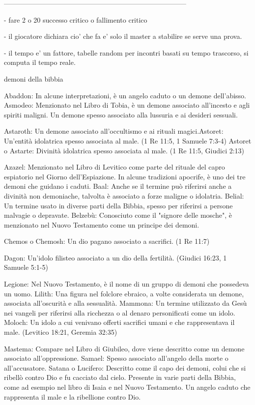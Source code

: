 \documentclass[12pt,a4paper,twoside,openany]{book}
\begin{document}
--------------------------------------------------------------------------------



- fare 2 o 20  successo critico o fallimento  critico

- il giocatore dichiara cio' che fa e' solo il master a stabilire se serve una prova. 

- il tempo e' un fattore, tabelle random per incontri basati su tempo trascorso, si computa il tempo reale.



demoni della bibbia

Abaddon: In alcune interpretazioni, è un angelo caduto o un demone dell'abisso.
Asmodeo: Menzionato nel Libro di Tobia, è un demone associato all'incesto e agli spiriti maligni. Un demone spesso associato alla lussuria e ai desideri sessuali.

Astaroth: Un demone associato all'occultismo e ai rituali magici.Astoret: Un'entità idolatrica spesso associata al male. (1 Re 11:5, 1 Samuele 7:3-4)
Astoret o Astarte: Divinità idolatrica spesso associata al male. (1 Re 11:5, Giudici 2:13)



Azazel: Menzionato nel Libro di Levitico come parte del rituale del capro espiatorio nel Giorno dell'Espiazione. In alcune tradizioni apocrife, è uno dei tre demoni che guidano i caduti.
Baal: Anche se il termine può riferirsi anche a divinità non demoniache, talvolta è associato a forze maligne o idolatria.
Belial: Un termine usato in diverse parti della Bibbia, spesso per riferirsi a persone malvagie o depravate.
Belzebù: Conosciuto come il "signore delle mosche", è menzionato nel Nuovo Testamento come un principe dei demoni.

Chemos o Chemosh: Un dio pagano associato a sacrifici. (1 Re 11:7)


Dagon: Un'idolo filisteo associato a un dio della fertilità. (Giudici 16:23, 1 Samuele 5:1-5)


Legione: Nel Nuovo Testamento, è il nome di un gruppo di demoni che possedeva un uomo.
Lilith: Una figura nel folclore ebraico, a volte considerata un demone, associata all'oscurità e alla sessualità.
Mammona: Un termine utilizzato da Gesù nei vangeli per riferirsi alla ricchezza o al denaro personificati come un idolo.
Moloch: Un idolo a cui venivano offerti sacrifici umani e che rappresentava il male. (Levitico 18:21, Geremia 32:35)


Mastema: Compare nel Libro di Giubileo, dove viene descritto come un demone associato all'oppressione.
Samael: Spesso associato all'angelo della morte o all'accusatore.
Satana o Lucifero: Descritto come il capo dei demoni, colui che si ribellò contro Dio e fu cacciato dal cielo. Presente in varie parti della Bibbia, come ad esempio nel libro di Isaia e nel Nuovo Testamento. Un angelo caduto che rappresenta il male e la ribellione contro Dio.
\end{document}

